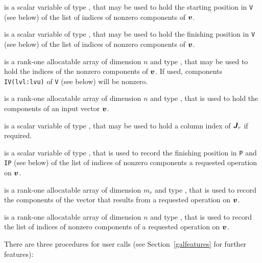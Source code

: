 \documentclass{galahad}
\begin{document}
\begin{description}

 is a scalar variable of type \integer, that
may be used to hold the starting position in {\tt V} (see below)
of the list of indices of nonzero components of ${\bm{v}}$.

 is a scalar variable of type \integer, that
may be used to hold the finishing position in {\tt V} (see below)
of the list of indices of nonzero components of ${\bm{v}}$.

 is a rank-one allocatable array of dimension $n$
and type \integer, that may be used to hold the indices of the
nonzero components of ${\bm{v}}$. If used, components
{\tt IV(lvl:lvu)} of {\tt V} (see below) will be nonzero.

 is a rank-one allocatable array of dimension $n$
and type \realdp, that is used to hold the components of an
input vector ${\bm{v}}$.

 is a scalar variable of type \integer, that
may be used to hold a column index of ${\bm{J}}_r$ if required.

 is a scalar variable of type \integer, that
is used to record the finishing position in 
{\tt P} and {\tt IP} (see below)
of the list of indices of nonzero components a requested operation on ${\bm{v}}$.

 is a rank-one allocatable array of dimension $m_r$
and type \realdp, that is used to record the components of the
vector that results from a requested operation on ${\bm{v}}$.

 is a rank-one allocatable array of dimension $n$
and type \integer, that is used to record the list of
indices of nonzero components of a requested operation on ${\bm{v}}$.

\end{description}




\galarguments
There are three procedures for user calls
(see Section~\ref{galfeatures} for further features):
\end{document}
